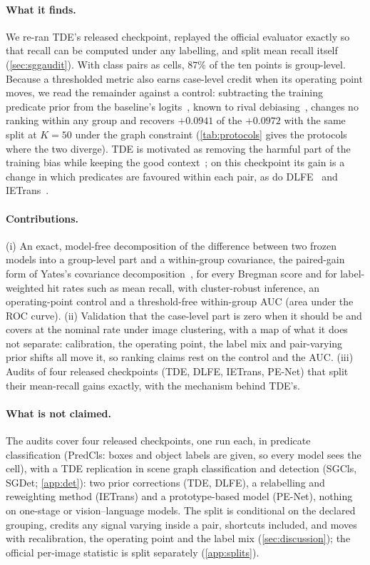 \paragraph{What it finds.} We re-ran TDE's released checkpoint, replayed the official
evaluator exactly so that recall can be computed under any labelling, and split mean recall
itself (\cref{sec:sggaudit}). With class pairs as cells, $87\%$ of the ten points is
group-level. Because a thresholded metric also earns case-level credit when its operating
point moves, we read the remainder against a control: subtracting the training predicate
prior from the baseline's logits~\cite{menon2021long}, known to rival
debiasing~\cite{chiou2021recovering,teng2022structured}, changes no ranking within any group
and recovers $+0.0941$ of the $+0.0972$ with the same split at $K=50$ under the graph
constraint (\cref{tab:protocols} gives the protocols where the two diverge). TDE is motivated
as removing the harmful part of the training bias while keeping the good
context~\cite{tang2020unbiased}; on this checkpoint its gain is a change in which predicates
are favoured within each pair, as do DLFE~\cite{chiou2021recovering} and
IETrans~\cite{zhang2022finegrained}.

\paragraph{Contributions.} (i) An exact, model-free decomposition of the difference between
two frozen models into a group-level part and a within-group covariance, the paired-gain form
of Yates's covariance decomposition~\cite{yates1982external}, for every Bregman score and for
label-weighted hit rates such as mean recall, with cluster-robust inference, an
operating-point control and a threshold-free within-group AUC (area under the
ROC curve). (ii) Validation that the
case-level part is zero when it should be and covers at the nominal rate under image
clustering, with a map of what it does not separate: calibration, the operating point, the
label mix and pair-varying prior shifts all move it, so ranking claims rest on the control and
the AUC. (iii) Audits of four released checkpoints (TDE, DLFE, IETrans, PE-Net) that split their
mean-recall gains exactly, with the mechanism behind TDE's.

\paragraph{What is not claimed.} The audits cover four released checkpoints, one run each, in
predicate classification (PredCls: boxes and object labels are given, so every model sees the
cell), with a TDE replication in scene graph classification and detection (SGCls, SGDet;
\cref{app:det}): two prior corrections (TDE, DLFE), a relabelling and reweighting method (IETrans) and a
prototype-based model (PE-Net), nothing on
one-stage or vision--language models. The split is conditional on the declared grouping, credits
any signal varying inside a pair, shortcuts included, and moves with recalibration, the
operating point and the label mix (\cref{sec:discussion}); the official per-image statistic is
split separately (\cref{app:splits}).
